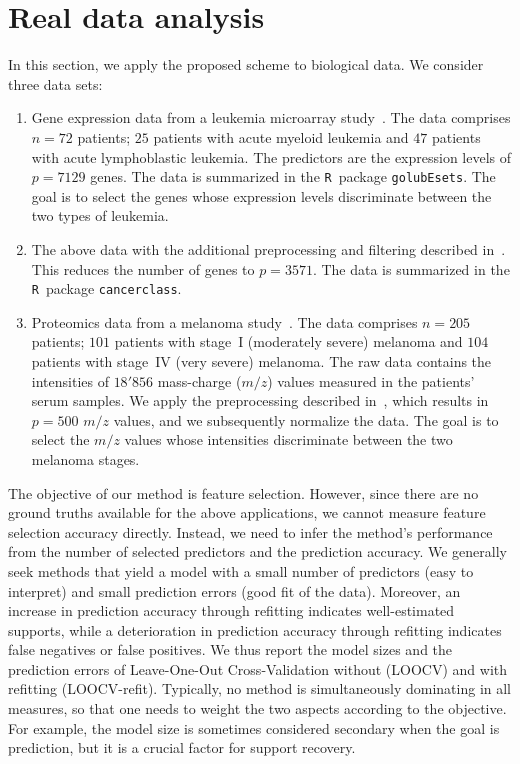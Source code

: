 \documentclass{elsarticle}
\begin{document}
\section{Real data analysis}\label{sec:rd}

In this section, we apply the proposed scheme to biological data. We consider three data sets:
\begin{enumerate}
  \item[a)]{Gene expression data from a leukemia microarray study~\citep{golub1999molecular}. The data comprises $n = 72$ patients; $25$ patients with acute myeloid leukemia  and $47$ patients with acute lymphoblastic leukemia. The predictors are  the expression levels of  $p=7129$ genes. The data is summarized in the \texttt{R}~package \texttt{golubEsets}. The goal is to select the genes whose expression levels discriminate between the two types of leukemia.}
\item[b)]{The above data with the additional preprocessing and filtering  described in~\citep{dudoit2002comparison}. This reduces the number of genes to $p = 3571$. The data is summarized in the \texttt{R}~package \texttt{cancerclass}.}
\item[c)]{Proteomics data from a melanoma study~\citep{mian2005serum}.
 The data comprises $n=205$ patients; $101$ patients with stage~I (moderately severe) melanoma and $104$ patients with stage~IV (very severe) melanoma. The raw data contains the  intensities of $18'856$ mass-charge ($m/z$) values measured in the patients' serum samples. We apply the preprocessing described in~\citep{vasiliu2018penalized}, which results in $p=500$ $m/z$ values, and we subsequently normalize the data. The goal is to select the $m/z$ values whose intensities  discriminate between the two melanoma stages.}
\end{enumerate}

The objective of our method is feature selection. However, since there are no ground truths available for the above applications, we cannot measure feature selection accuracy directly. Instead, we need to infer the method's performance from the number of selected predictors and the prediction accuracy. We generally seek methods that yield a model with a small number of predictors (easy to interpret) and small prediction errors (good fit of the data). Moreover, an increase in prediction accuracy through refitting indicates well-estimated supports, while a deterioration in prediction accuracy through refitting indicates false negatives or false positives. We thus report the model sizes and the prediction errors of Leave-One-Out Cross-Validation without (LOOCV) and with  refitting (LOOCV-refit). Typically, no method is simultaneously dominating in all measures, so that one needs to weight the two aspects according to the objective. For example, the model size is sometimes considered secondary when the goal is prediction, but it is a crucial factor for support recovery.
\end{document}
